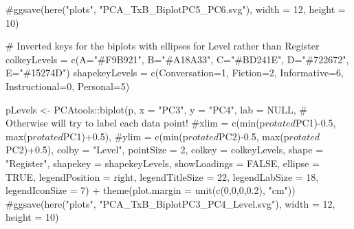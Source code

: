 \documentclass[
  letterpaper,
  DIV=11,
  numbers=noendperiod]{scrreprt}
\newenvironment{Shaded}{\begin{snugshade}}{\end{snugshade}}
\newcommand{\AttributeTok}[1]{\textcolor[rgb]{0.40,0.45,0.13}{#1}}
\newcommand{\CommentTok}[1]{\textcolor[rgb]{0.37,0.37,0.37}{#1}}
\newcommand{\ConstantTok}[1]{\textcolor[rgb]{0.56,0.35,0.01}{#1}}
\newcommand{\DecValTok}[1]{\textcolor[rgb]{0.68,0.00,0.00}{#1}}
\newcommand{\FloatTok}[1]{\textcolor[rgb]{0.68,0.00,0.00}{#1}}
\newcommand{\FunctionTok}[1]{\textcolor[rgb]{0.28,0.35,0.67}{#1}}
\newcommand{\NormalTok}[1]{\textcolor[rgb]{0.00,0.23,0.31}{#1}}
\newcommand{\OtherTok}[1]{\textcolor[rgb]{0.00,0.23,0.31}{#1}}
\newcommand{\SpecialCharTok}[1]{\textcolor[rgb]{0.37,0.37,0.37}{#1}}
\newcommand{\StringTok}[1]{\textcolor[rgb]{0.13,0.47,0.30}{#1}}
\begin{document}
\begin{Shaded}
\begin{Highlighting}[]
\CommentTok{\#ggsave(here("plots", "PCA\_TxB\_BiplotPC5\_PC6.svg"), width = 12, height = 10)}
\end{Highlighting}
\end{Shaded}

\begin{Shaded}
\begin{Highlighting}[]
\CommentTok{\# Inverted keys for the biplots with ellipses for Level rather than Register}
\NormalTok{colkeyLevels }\OtherTok{=} \FunctionTok{c}\NormalTok{(}\AttributeTok{A=}\StringTok{"\#F9B921"}\NormalTok{, }\AttributeTok{B=}\StringTok{"\#A18A33"}\NormalTok{, }\AttributeTok{C=}\StringTok{"\#BD241E"}\NormalTok{, }\AttributeTok{D=}\StringTok{"\#722672"}\NormalTok{, }\AttributeTok{E=}\StringTok{"\#15274D"}\NormalTok{)}
\NormalTok{shapekeyLevels }\OtherTok{=} \FunctionTok{c}\NormalTok{(}\AttributeTok{Conversation=}\DecValTok{1}\NormalTok{, }\AttributeTok{Fiction=}\DecValTok{2}\NormalTok{, }\AttributeTok{Informative=}\DecValTok{6}\NormalTok{, }\AttributeTok{Instructional=}\DecValTok{0}\NormalTok{, }\AttributeTok{Personal=}\DecValTok{5}\NormalTok{)}

\NormalTok{pLevels }\OtherTok{\textless{}{-}}\NormalTok{ PCAtools}\SpecialCharTok{::}\FunctionTok{biplot}\NormalTok{(p,}
                 \AttributeTok{x =} \StringTok{"PC3"}\NormalTok{,}
                 \AttributeTok{y =} \StringTok{"PC4"}\NormalTok{,}
                 \AttributeTok{lab =} \ConstantTok{NULL}\NormalTok{, }\CommentTok{\# Otherwise will try to label each data point!}
                 \CommentTok{\#xlim = c(min(p$rotated$PC1){-}0.5, max(p$rotated$PC1)+0.5),}
                 \CommentTok{\#ylim = c(min(p$rotated$PC2){-}0.5, max(p$rotated$PC2)+0.5),}
                 \AttributeTok{colby =} \StringTok{"Level"}\NormalTok{,}
                 \AttributeTok{pointSize =} \DecValTok{2}\NormalTok{,}
                 \AttributeTok{colkey =}\NormalTok{ colkeyLevels,}
                 \AttributeTok{shape =} \StringTok{"Register"}\NormalTok{,}
                 \AttributeTok{shapekey =}\NormalTok{ shapekeyLevels,}
                 \AttributeTok{showLoadings =} \ConstantTok{FALSE}\NormalTok{,}
                 \AttributeTok{ellipse =} \ConstantTok{TRUE}\NormalTok{,}
                 \AttributeTok{legendPosition =} \StringTok{\textquotesingle{}right\textquotesingle{}}\NormalTok{,}
                 \AttributeTok{legendTitleSize =} \DecValTok{22}\NormalTok{,}
                 \AttributeTok{legendLabSize =} \DecValTok{18}\NormalTok{, }
                 \AttributeTok{legendIconSize =} \DecValTok{7}\NormalTok{) }\SpecialCharTok{+}
  \FunctionTok{theme}\NormalTok{(}\AttributeTok{plot.margin =} \FunctionTok{unit}\NormalTok{(}\FunctionTok{c}\NormalTok{(}\DecValTok{0}\NormalTok{,}\DecValTok{0}\NormalTok{,}\DecValTok{0}\NormalTok{,}\FloatTok{0.2}\NormalTok{), }\StringTok{"cm"}\NormalTok{))}
\CommentTok{\#ggsave(here("plots", "PCA\_TxB\_BiplotPC3\_PC4\_Level.svg"), width = 12, height = 10)}


\end{Highlighting}
\end{Shaded}
\end{document}
